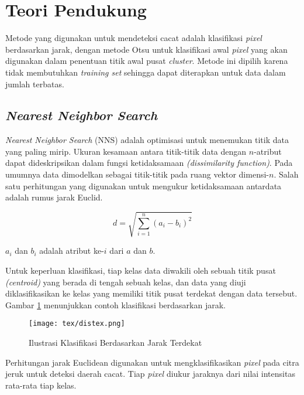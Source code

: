 \documentclass[laporan.tex]{subfiles}
\begin{document}
\section{Teori Pendukung}

Metode yang digunakan untuk mendeteksi cacat adalah klasifikasi \emph{pixel} berdasarkan jarak, dengan metode Otsu untuk klasifikasi awal \emph{pixel} yang akan digunakan dalam penentuan titik awal pusat \emph{cluster}. Metode ini dipilih karena tidak membutuhkan \emph{training set} sehingga dapat diterapkan untuk data dalam jumlah terbatas.

\subsection{\emph{Nearest Neighbor Search}}

\emph{Nearest Neighbor Search} (NNS) adalah optimisasi untuk menemukan titik data yang paling mirip. Ukuran kesamaan antara titik-titik data dengan $n$-atribut dapat dideskripsikan dalam fungsi ketidaksamaan \emph{(dissimilarity function)}.\cite{knuth} Pada umumnya data dimodelkan sebagai titik-titik pada ruang vektor dimensi-$n$. Salah satu perhitungan yang digunakan untuk mengukur ketidaksamaan antardata adalah rumus jarak Euclid.

\begin{equation}
	d=\sqrt{\sum_{i=1}^n (a_i - b_i)^2}
\end{equation}

$a_i$ dan $b_i$ adalah atribut ke-$i$ dari $a$ dan $b$.

Untuk keperluan klasifikasi, tiap kelas data diwakili oleh sebuah titik pusat \emph{(centroid)} yang berada di tengah sebuah kelas, dan data yang diuji diklasifikasikan ke kelas yang memiliki titik pusat terdekat dengan data tersebut. Gambar \ref{fig:distex} menunjukkan contoh klasifikasi berdasarkan jarak.

\begin{figure}[h]
\centering
\texttt{[image: tex/distex.png]}
\caption{Ilustrasi Klasifikasi Berdasarkan Jarak Terdekat}
\label{fig:distex}
\end{figure}

Perhitungan jarak Euclidean digunakan untuk mengklasifikasikan \emph{pixel} pada citra jeruk untuk deteksi daerah cacat. Tiap \emph{pixel} diukur jaraknya dari nilai intensitas rata-rata tiap kelas.
\end{document}

